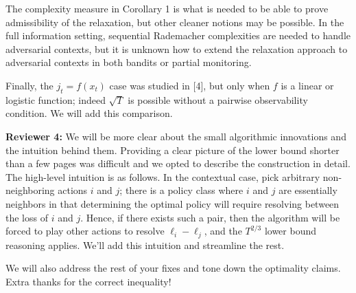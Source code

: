 \documentclass{article}
\begin{document}
The complexity measure in Corollary 1 is what is needed to be able to prove admissibility of the relaxation, but other cleaner notions may be possible. In the full information setting, sequential Rademacher complexities are needed to handle adversarial contexts, but it is unknown how to extend the relaxation approach to adversarial contexts in both bandits or partial monitoring.

Finally, the $j_t = f(x_t)$ case was studied in [4], but only when $f$ is a linear or logistic function; indeed $\sqrt{T}$ is possible without a pairwise observability condition. We will add this comparison.


\textbf{Reviewer 4:}
We will be more clear about the small algorithmic innovations and the intuition behind them. Providing a clear picture of the lower bound shorter than a few pages was difficult and we opted to describe the construction in detail. The high-level intuition is as follows. In the contextual case, pick arbitrary non-neighboring actions $i$ and $j$; there is a policy class where $i$ and $j$ are essentially neighbors in that determining the optimal policy will require resolving between the loss of $i$ and $j$. Hence, if there exists such a pair, then the algorithm will be forced to play other actions to resolve $\ell_i-\ell_j$, and the $T^{2/3}$ lower bound reasoning applies. We'll add this intuition and streamline the rest.

We will also address the rest of your fixes and tone down the optimality claims. Extra thanks for the correct inequality!
\end{document}
